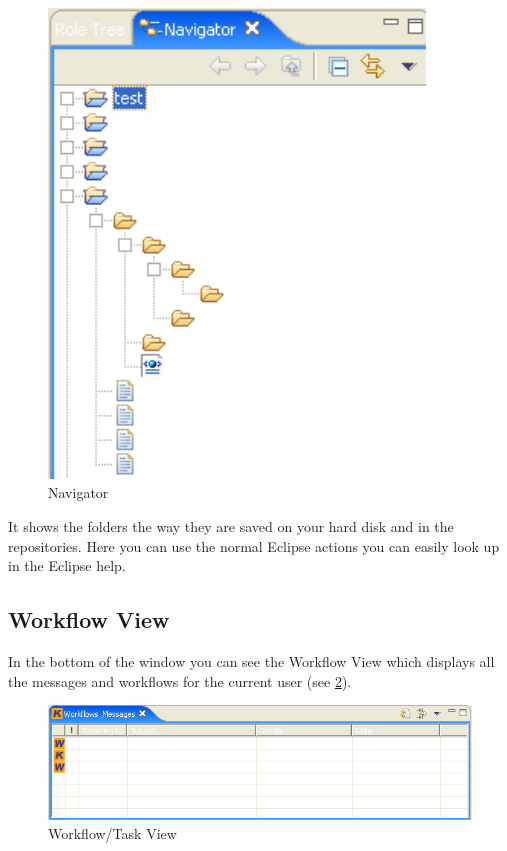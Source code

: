 \begin{figure}[h!]
\begin{center}
\includegraphics[width=10cm]{roletree2.png}
   \caption{Navigator}
\label{navigator}
\end{center}
\end{figure}\par

It shows the folders the way they are saved on your hard disk and in the repositories.
Here you can use the normal Eclipse actions you can easily look up in the Eclipse help.






\subsection{Workflow View}

In the bottom of the window you can see the Workflow View which displays all 
the messages and workflows for the current user (see \ref{workflow}). 

\begin{figure}[h!]
\begin{center}
\includegraphics[width=15cm]{workflow.png}
   \caption{Workflow/Task View}
\label{workflow}
\end{center}
\end{figure}\par

